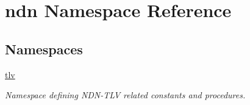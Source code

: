 \hypertarget{namespacendn}{}\section{ndn Namespace Reference}
\label{namespacendn}
\subsection*{Namespaces}
\begin{DoxyCompactItemize}
\item 
 \hyperlink{namespacendn_1_1tlv}{tlv}
\begin{DoxyCompactList}\small\item\em Namespace defining N\+D\+N-\/\+T\+LV related constants and procedures. \end{DoxyCompactList}\end{DoxyCompactItemize}
